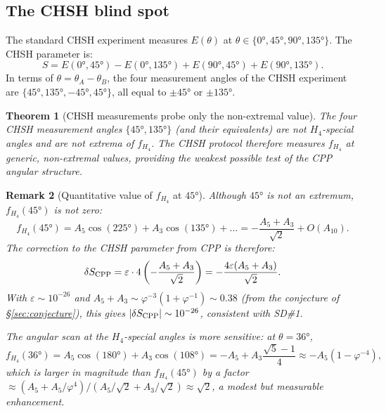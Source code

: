 \documentclass[11pt,a4paper]{article}
\newtheorem{theorem}{Theorem}[section]
\newtheorem{remark}[theorem]{Remark}
\newcommand{\phig}{\varphi}
\newcommand{\eps}{\varepsilon}
\begin{document}
\subsection{The CHSH blind spot}

The standard CHSH experiment measures $E(\theta)$ at
$\theta \in \{0°, 45°, 90°, 135°\}$.  The CHSH parameter is:
\begin{equation}
S = E(0°,45°) - E(0°,135°) + E(90°,45°) + E(90°,135°).
\label{eq:CHSH}
\end{equation}
In terms of $\theta = \theta_A - \theta_B$, the four measurement
angles of the CHSH experiment are $\{45°, 135°, -45°, 45°\}$, all
equal to $\pm45°$ or $\pm135°$.

\begin{theorem}[CHSH measurements probe only the non-extremal value]
\label{thm:blind_spot}
The four CHSH measurement angles $\{45°, 135°\}$ (and their
equivalents) are not $H_4$-special angles and are not extrema of
$f_{H_4}$.  The CHSH protocol therefore measures $f_{H_4}$ at
generic, non-extremal values, providing the weakest possible
test of the CPP angular structure.
\end{theorem}

\begin{remark}[Quantitative value of $f_{H_4}$ at $45°$]
Although $45°$ is not an extremum, $f_{H_4}(45°)$ is not zero:
\begin{equation}
f_{H_4}(45°)
= A_5\cos(225°) + A_3\cos(135°) + \ldots
= -\frac{A_5 + A_3}{\sqrt{2}} + O(A_{10}).
\label{eq:f45}
\end{equation}
The correction to the CHSH parameter from CPP is therefore:
\begin{equation}
\delta S_{\rm CPP}
= \eps \cdot 4\left(-\frac{A_5 + A_3}{\sqrt{2}}\right)
= -\frac{4\eps(A_5 + A_3)}{\sqrt{2}}.
\label{eq:deltaS_CHSH}
\end{equation}
With $\eps \sim 10^{-26}$ and $A_5 + A_3 \sim \phig^{-3}(1 +
\phig^{-1}) \sim 0.38$ (from the conjecture of
\S\ref{sec:conjecture}), this gives $|\delta S_{\rm CPP}|
\sim 10^{-26}$, consistent with SD\#1.

The \emph{angular scan} at the $H_4$-special angles is more
sensitive: at $\theta = 36°$,
\begin{equation}
f_{H_4}(36°)
= A_5\cos(180°) + A_3\cos(108°)
= -A_5 + A_3\frac{\sqrt5-1}{4}
\approx -A_5(1 - \phig^{-4}),
\label{eq:f36}
\end{equation}
which is \emph{larger in magnitude} than $f_{H_4}(45°)$ by a factor
$\approx (A_5 + A_5/\phig^4)/(A_5/\sqrt2 + A_3/\sqrt2) \approx
\sqrt2$, a modest but measurable enhancement.
\end{remark}
\end{document}
